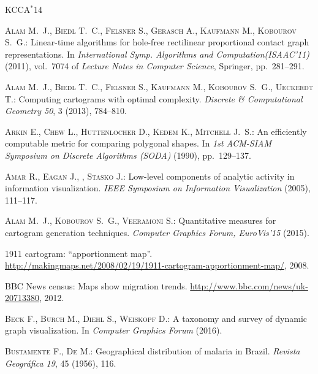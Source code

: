 \documentclass{egpubl}
\begin{document}
\newcommand{\etalchar}[1]{$^{#1}$}
\begin{thebibliography}{\uppercase{KCCA{\etalchar{*}}14}}

\bibitem[ABF{\etalchar{*}}11]{ourISAAC}
\textsc{Alam M.~J., Biedl T.~C., Felsner S., Gerasch A., Kaufmann M., Kobourov
  S.~G.}:
\newblock Linear-time algorithms for hole-free rectilinear proportional contact
  graph representations.
\newblock In \emph{International Symp. Algorithms and Computation(ISAAC'11)}
  (2011), vol.~7074 of \emph{Lecture Notes in Computer Science}, Springer,
  pp.~281--291.

\bibitem[ABF{\etalchar{*}}13]{ourSoCG}
\textsc{Alam M.~J., Biedl T.~C., Felsner S., Kaufmann M., Kobourov S.~G.,
  Ueckerdt T.}:
\newblock Computing cartograms with optimal complexity.
\newblock \emph{Discrete \& Computational Geometry 50}, 3 (2013), 784--810.

\bibitem[ACH{\etalchar{*}}90]{ACH91}
\textsc{Arkin E., Chew L., Huttenlocher D., Kedem K., Mitchell J.~S.}:
\newblock An efficiently computable metric for comparing polygonal shapes.
\newblock In \emph{1st ACM-SIAM Symposium on Discrete Algorithms (SODA)}
  (1990), pp.~129--137.

\textsc{Amar R., Eagan J., , Stasko J.}:
\newblock Low-level components of analytic activity in information
  visualization.
\newblock \emph{IEEE Symposium on Information Visualization} (2005), 111--117.

\textsc{Alam M.~J., Kobourov S.~G., Veeramoni S.}:
\newblock Quantitative measures for cartogram generation techniques.
\newblock \emph{Computer Graphics Forum, EuroVis'15} (2015).

1911 cartogram: ``apportionment map''.
\newblock
  \url{http://makingmaps.net/2008/02/19/1911-cartogram-apportionment-map/},
  2008.

{BBC News} census: Maps show migration trends.
\newblock \url{http://www.bbc.com/news/uk-20713380}, 2012.

\textsc{Beck F., Burch M., Diehl S., Weiskopf D.}:
\newblock A taxonomy and survey of dynamic graph visualization.
\newblock In \emph{Computer Graphics Forum} (2016).

\textsc{Bustamente F., De M.}:
\newblock Geographical distribution of malaria in {Brazil}.
\newblock \emph{Revista Geogr{\'a}fica 19}, 45 (1956), 116.


\end{thebibliography}
\end{document}
